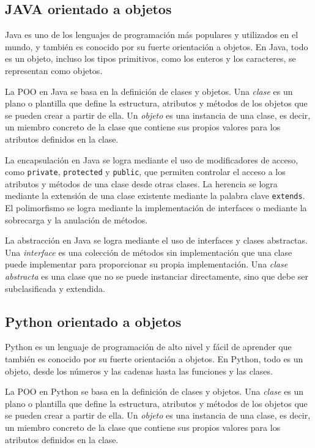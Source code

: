 \documentclass[executivepaper]{article}
\begin{document}
\subsection*{JAVA orientado a objetos}
Java es uno de los lenguajes de programación más populares y utilizados en el mundo, y también es conocido por su fuerte orientación a objetos. En Java, todo es un objeto, incluso los tipos primitivos, como los enteros y los caracteres, se representan como objetos.

La POO en Java se basa en la definición de clases y objetos. Una \textit{clase} es un plano o plantilla que define la estructura, atributos y métodos de los objetos que se pueden crear a partir de ella. Un \textit{objeto} es una instancia de una clase, es decir, un miembro concreto de la clase que contiene sus propios valores para los atributos definidos en la clase.

La encapsulación en Java se logra mediante el uso de modificadores de acceso, como \texttt{private}, \texttt{protected} y \texttt{public}, que permiten controlar el acceso a los atributos y métodos de una clase desde otras clases. La herencia se logra mediante la extensión de una clase existente mediante la palabra clave \texttt{extends}. El polimorfismo se logra mediante la implementación de interfaces o mediante la sobrecarga y la anulación de métodos.

La abstracción en Java se logra mediante el uso de interfaces y clases abstractas. Una \textit{interface} es una colección de métodos sin implementación que una clase puede implementar para proporcionar su propia implementación. Una \textit{clase abstracta} es una clase que no se puede instanciar directamente, sino que debe ser subclasificada y extendida.

\subsection*{Python orientado a objetos}
Python es un lenguaje de programación de alto nivel y fácil de aprender que también es conocido por su fuerte orientación a objetos. En Python, todo es un objeto, desde los números y las cadenas hasta las funciones y las clases.

La POO en Python se basa en la definición de clases y objetos. Una \textit{clase} es un plano o plantilla que define la estructura, atributos y métodos de los objetos que se pueden crear a partir de ella. Un \textit{objeto} es una instancia de una clase, es decir, un miembro concreto de la clase que contiene sus propios valores para los atributos definidos en la clase.
\end{document}
